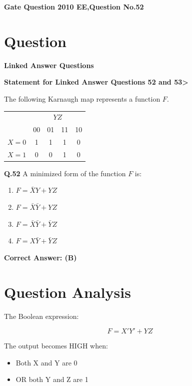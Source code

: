 \documentclass[12pt,a4paper]{article}
\newcommand{\bluesection}[1]{
\section*{\color{blue}#1}
}
\begin{document}
\thispagestyle{firstpage}\vspace*{0.5cm}
\pagestyle{plain}

\begin{center}
    \Large \textbf{Gate Question 2010 EE,Question No.52}
\end{center}

\vspace{0.5cm}

\bluesection{Question}

\textbf{Linked Answer Questions}

\textbf{Statement for Linked Answer Questions 52 and 53>}

The following Karnaugh map represents a function $F$.

\vspace{0.4cm}

\begin{center}
\begin{tabular}{c|c c c c}
 & \multicolumn{4}{c}{$YZ$} \\
 & 00 & 01 & 11 & 10 \\
\hline
$X=0$ & 1 & 1 & 1 & 0 \\
$X=1$ & 0 & 0 & 1 & 0 \\
\end{tabular}
\end{center}

\vspace{0.4cm}

\textbf{Q.52} A minimized form of the function $F$ is:

\begin{enumerate}
\item[(A)] $F = \bar{X}Y + YZ$
\item[(B)] $F =\bar{ X}\bar{Y} + YZ$
\item[(C)] $F = \bar{X}\bar{Y} + \bar{Y}Z$
\item[(D)] $F = X\bar{Y} + \bar{Y}Z$
\end{enumerate}

\vspace{0.3cm}
\textbf{Correct Answer: (B)}
\bluesection{Question Analysis}

The Boolean expression:

\[
F = X'Y' + YZ
\]

The output becomes HIGH when:
\begin{itemize}
    \item Both X and Y are 0
    \item OR both Y and Z are 1
\end{itemize}
\end{document}
